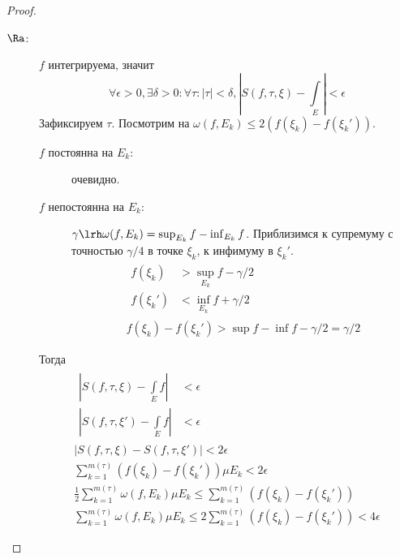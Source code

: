 \begin{proof}
	\begin{description}
	\item[$\Ra$:]
		$f$ интегрируема, значит
		\[
			\forall \epsilon > 0, \exists \delta > 0\colon \forall \tau\colon |\tau| < \delta,
				\left| S(f, \tau, \xi) - \int\limits_E \right| < \epsilon
		\]
		Зафиксируем $\tau$.
		Посмотрим на $\omega(f, E_k) \le 2(f(\xi_k) - f(\xi_k'))$.
		\begin{description}
		\item[$f$ постоянна на $E_k$:] очевидно.
		\item[$f$ непостоянна на $E_k$:] $\gamma \lrh \omega(f, E_k) = \sup_{E_k} f - \inf_{E_k} f$.
			Приблизимся к супремуму с точностью $\gamma/4$ в точке $\xi_k$, к инфимуму в $\xi_k'$.
			\begin{gather*}
				\begin{aligned}
					f(\xi_k)  &> \sup_{E_k} f - \gamma / 2 \\
					f(\xi_k') &< \inf_{E_k} f + \gamma / 2
				\end{aligned} \\
				f(\xi_k) - f(\xi_k') > \sup f - \inf f - \gamma/2 = \gamma/2
			\end{gather*}
		\end{description}
		Тогда
		\begin{gather*}
			\begin{aligned}
				\left| S(f, \tau, \xi ) - \int\limits_E f \right| &< \epsilon \\
				\left| S(f, \tau, \xi') - \int\limits_E f \right| &< \epsilon
			\end{aligned} \\
			\left| S(f, \tau, \xi) - S(f, \tau, \xi') \right| < 2\epsilon \\
			\sum_{k=1}^{m(\tau)} \left( f(\xi_k) - f(\xi_k') \right) \mu E_k < 2\epsilon \\
			\frac12 \sum_{k=1}^{m(\tau)} \omega(f, E_k) \mu E_k \le \sum_{k=1}^{m(\tau)} \left( f(\xi_k) - f(\xi_k') \right) \\
			\sum_{k=1}^{m(\tau)} \omega(f, E_k) \mu E_k \le 2\sum_{k=1}^{m(\tau)} \left( f(\xi_k) - f(\xi_k') \right) < 4\epsilon
		\end{gather*}


\end{description}
\end{proof}
